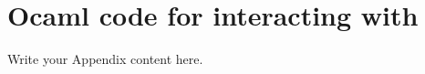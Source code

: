\chapter{Ocaml code for interacting with \why} %

\label{AppendixB} %

Write your Appendix content here.